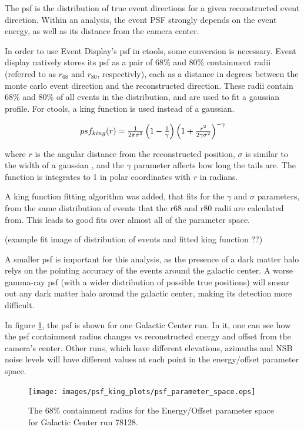 The psf is the distribution of true event directions for a given reconstructed event direction.
Within an analysis, the event PSF strongly depends on the event energy, as well as its distance from the camera center.

In order to use Event Display's psf in ctools, some conversion is necessary.
Event display natively stores its psf as a pair of 68\% and 80\% containment radii (referred to as $r_68$ and $r_80$, respectivly), each as a distance in degrees between the monte carlo event direction and the reconstructed direction.
These radii contain 68\% and 80\% of all events in the distribution, and are used to fit a gaussian profile.
For ctools, a king function is used instead of a gaussian.

\begin{equation} \label{eqn:king}
$$ psf_{king}(r) = \frac{1}{2 \pi \sigma^{2} } \left( 1 - \frac{1}{\gamma} \right) \left( 1 + \frac{ r^{2} }{ 2 \gamma \sigma^{2} } \right)^{-\gamma} $$
\end{equation}

where $r$ is the angular distance from the reconstructed position, $\sigma$ is similar to the width of a gaussian , and the $\gamma$ parameter affects how long the tails are.
The function is integrates to 1 in polar coordinates with $r$ in radians.

A king function fitting algorithm was added, that fits for the $\gamma$ and $\sigma$ parameters, from the same distribution of events that the r68 and r80 radii are calculated from.
This leads to good fits over almost all of the parameter space.

(example fit image of distribution of events and fitted king function ??)

A smaller psf is important for this analysis, as the presence of a dark matter halo relys on the pointing accuracy of the events around the galactic center.
A worse gamma-ray psf (with a wider distribution of possible true positions) will smear out any dark matter halo around the galactic center, making its detection more difficult.

In figure \ref{fig:psf_paramspace}, the psf is shown for one Galactic Center run.
In it, one can see how the psf containment radius changes vs reconstructed energy and offset from the camera's center.
Other runs, which have different elevations, azimuths and NSB noise levels will have different values at each point in the energy/offset parameter space.

\begin{figure}[ht]
  \begin{center}
    \texttt{[image: images/psf\_king\_plots/psf\_parameter\_space.eps]}
    \caption[PSF Parameter Space]{The 68\% containment radius for the Energy/Offset parameter space for Galactic Center run 78128.}\label{fig:psf_paramspace}
  \end{center}
\end{figure}

